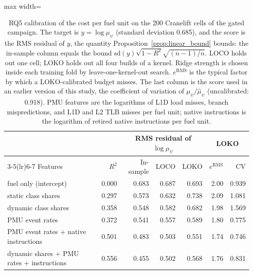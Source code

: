 \begin{table}[t]
\caption{RQ5 calibration of the cost per fuel unit on the 200 Cranelift cells of the gated campaign. The target is $y=\log\mu_\psi$ (standard deviation 0.685), and the score is the RMS residual of $y$, the quantity Proposition~\ref{prop:linear_bound} bounds: the in-sample column equals the bound $\mathrm{sd}(y)\sqrt{1-R^2}\sqrt{(n-1)/n}$. LOCO holds out one cell; LOKO holds out all four builds of a kernel. Ridge strength is chosen inside each training fold by leave-one-kernel-out search. $e^{\mathrm{RMS}}$ is the typical factor by which a LOKO-calibrated budget misses. The last column is the score used in an earlier version of this study, the coefficient of variation of $\mu_\psi/\hat\mu_\psi$ (uncalibrated: 0.918). PMU features are the logarithms of L1D load misses, branch mispredictions, and L1D and L2 TLB misses per fuel unit; native instructions is the logarithm of retired native instructions per fuel unit.}\label{tab:rq5}
\footnotesize
\setlength{\tabcolsep}{4pt}%
\begin{adjustbox}{max width=\textwidth}%
\begin{tabular}{lrrrrrr}
\toprule
 & & \multicolumn{3}{c}{RMS residual of $\log\mu_\psi$} & \multicolumn{2}{c}{LOKO} \\
\cmidrule(lr){3-5}\cmidrule(lr){6-7}
Features & $R^2$ & In-sample & LOCO & LOKO & $e^{\mathrm{RMS}}$ & CV \\
\midrule
fuel only (intercept) & 0.000 & 0.683 & 0.687 & 0.693 & 2.00 & 0.939 \\
static class shares & 0.297 & 0.573 & 0.632 & 0.738 & 2.09 & 1.081 \\
dynamic class shares & 0.358 & 0.548 & 0.582 & 0.682 & 1.98 & 1.569 \\
PMU event rates & 0.372 & 0.541 & 0.557 & 0.589 & 1.80 & 0.775 \\
PMU event rates + native instructions & 0.501 & 0.483 & 0.503 & 0.551 & 1.74 & 0.746 \\
dynamic shares + PMU rates + instructions & 0.556 & 0.455 & 0.502 & 0.568 & 1.76 & 0.831 \\
\bottomrule
\end{tabular}%
\end{adjustbox}
\end{table}

